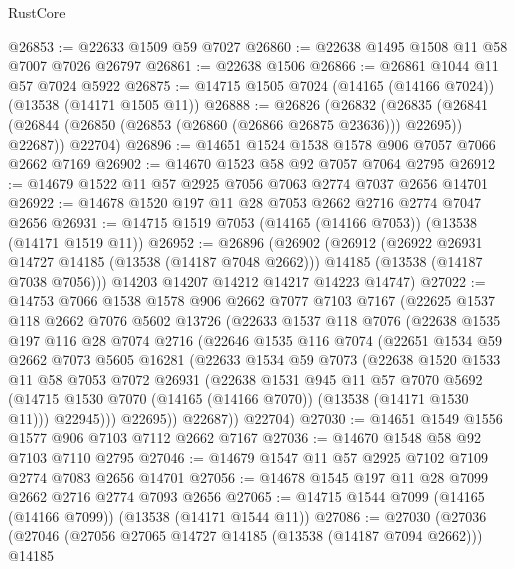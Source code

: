 \begin{lexlean}{RustCore}
\begin{coremodule}
@26853 := @22633 @1509 @59 @7027
@26860 := @22638 @1495 @1508 @11 @58 @7007 @7026 @26797
@26861 := @22638 @1506
@26866 := @26861 @1044 @11 @57 @7024 @5922
@26875 := @14715 @1505 @7024 (@14165 (@14166 @7024)) (@13538 (@14171 @1505 @11))
@26888 := @26826
    (@26832
      (@26835 (@26841 (@26844 (@26850 (@26853 (@26860 (@26866 @26875 @23636))) @22695)) @22687))
      @22704)
@26896 := @14651 @1524 @1538 @1578 @906 @7057 @7066 @2662 @7169
@26902 := @14670 @1523 @58 @92 @7057 @7064 @2795
@26912 := @14679 @1522 @11 @57 @2925 @7056 @7063 @2774 @7037 @2656 @14701
@26922 := @14678 @1520 @197 @11 @28 @7053 @2662 @2716 @2774 @7047 @2656
@26931 := @14715 @1519 @7053 (@14165 (@14166 @7053)) (@13538 (@14171 @1519 @11))
@26952 := @26896
    (@26902
      (@26912
        (@26922 @26931 @14727 @14185 (@13538 (@14187 @7048 @2662)))
        @14185
        (@13538 (@14187 @7038 @7056)))
      @14203
      @14207
      @14212
      @14217
      @14223
      @14747)
@27022 := @14753
    @7066
    @1538
    @1578
    @906
    @2662
    @7077
    @7103
    @7167
    (@22625
      @1537
      @118
      @2662
      @7076
      @5602
      @13726
      (@22633
        @1537
        @118
        @7076
        (@22638
          @1535
          @197
          @116
          @28
          @7074
          @2716
          (@22646
            @1535
            @116
            @7074
            (@22651
              @1534
              @59
              @2662
              @7073
              @5605
              @16281
              (@22633
                @1534
                @59
                @7073
                (@22638
                  @1520
                  @1533
                  @11
                  @58
                  @7053
                  @7072
                  @26931
                  (@22638
                    @1531
                    @945
                    @11
                    @57
                    @7070
                    @5692
                    (@14715 @1530 @7070 (@14165 (@14166 @7070)) (@13538 (@14171 @1530 @11)))
                    @22945)))
              @22695))
          @22687))
      @22704)
@27030 := @14651 @1549 @1556 @1577 @906 @7103 @7112 @2662 @7167
@27036 := @14670 @1548 @58 @92 @7103 @7110 @2795
@27046 := @14679 @1547 @11 @57 @2925 @7102 @7109 @2774 @7083 @2656 @14701
@27056 := @14678 @1545 @197 @11 @28 @7099 @2662 @2716 @2774 @7093 @2656
@27065 := @14715 @1544 @7099 (@14165 (@14166 @7099)) (@13538 (@14171 @1544 @11))
@27086 := @27030
    (@27036
      (@27046
        (@27056 @27065 @14727 @14185 (@13538 (@14187 @7094 @2662)))
        @14185

\end{coremodule}
\end{lexlean}
